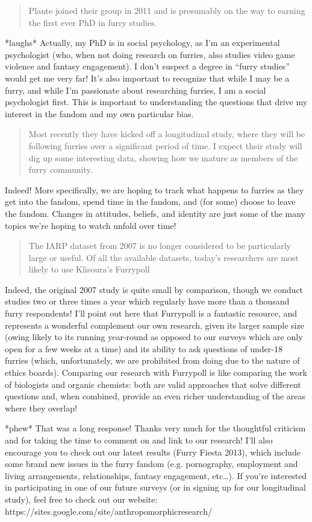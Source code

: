\begin{quote}
  Plante joined their group in 2011 and is presumably on the way to earning the first ever PhD in furry studies.
\end{quote}

*laughs* Actually, my PhD is in social psychology, as I'm an experimental psychologist (who, when not doing research on furries, also studies video game violence and fantasy engagement). I don't suspect a degree in ``furry studies'' would get me very far! It's also important to recognize that while I may be a furry, and while I'm passionate about researching furries, I am a social psychologist first. This is important to understanding the questions that drive my interest in the fandom and my own particular bias.

\begin{quote}
  Most recently they have kicked off a longitudinal study, where they will be following furries over a significant period of time. I expect their study will dig up some interesting data, showing how we mature as members of the furry community.
\end{quote}

Indeed! More specifically, we are hoping to track what happens to furries as they get into the fandom, spend time in the fandom, and (for some) choose to leave the fandom. Changes in attitudes, beliefs, and identity are just some of the many topics we're hoping to watch unfold over time!

\begin{quote}
  The IARP dataset from 2007 is no longer considered to be particularly large or useful. Of all the available datasets, today's researchers are most likely to use Klisoura's Furrypoll
\end{quote}

Indeed, the original 2007 study is quite small by comparison, though we conduct studies two or three times a year which regularly have more than a thousand furry respondents! I'll point out here that Furrypoll is a fantastic resource, and represents a wonderful complement our own research, given its larger sample size (owing likely to its running year-round as opposed to our surveys which are only open for a few weeks at a time) and its ability to ask questions of under-18 furries (which, unfortunately, we are prohibited from doing due to the nature of ethics boards). Comparing our research with Furrypoll is like comparing the work of biologists and organic chemists: both are valid approaches that solve different questions and, when combined, provide an even richer understanding of the areas where they overlap!

*phew* That was a long response! Thanks very much for the thoughtful criticism and for taking the time to comment on and link to our research! I'll also encourage you to check out our latest results (Furry Fiesta 2013), which include some brand new issues in the furry fandom (e.g. pornography, employment and living arrangements, relationships, fantasy engagement, etc…). If you're interested in participating in one of our future surveys (or in signing up for our longitudinal study), feel free to check out our website: https://sites.google.com/site/anthropomorphicresearch/
